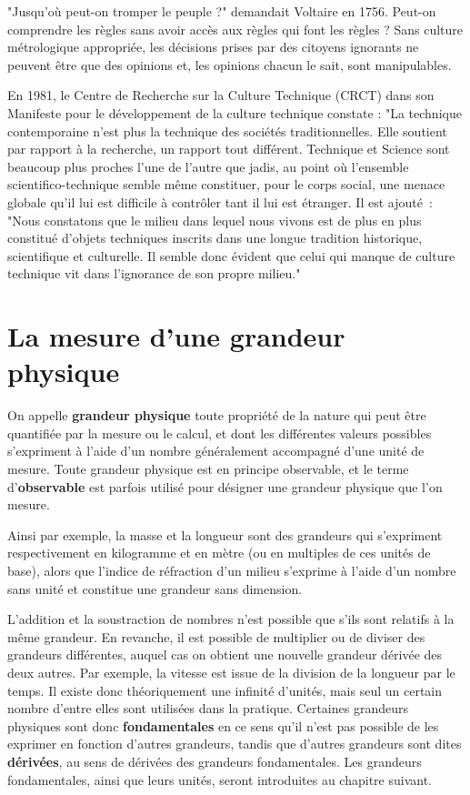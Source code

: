 \documentclass[main.tex]{subfiles}
\begin{document}
"Jusqu'où peut-on tromper le peuple ?" demandait Voltaire en 1756.  Peut-on comprendre les règles sans avoir accès aux règles qui font les règles ?  Sans culture métrologique appropriée, les décisions prises par des citoyens ignorants ne peuvent être que des opinions et, les opinions chacun le sait, sont manipulables.

En 1981, le Centre de Recherche sur la Culture Technique (CRCT) dans son Manifeste pour le développement de la culture technique constate : "La technique contemporaine n'est plus la technique des sociétés traditionnelles. Elle soutient par rapport à la recherche, un rapport tout différent. Technique et Science sont beaucoup plus proches l'une de l'autre que jadis, au point où l'ensemble scientifico-technique semble même constituer, pour le corps social, une menace globale qu'il lui est difficile à contrôler tant il lui est étranger. Il est ajouté~: "Nous constatons que le milieu dans lequel nous vivons est de plus en plus constitué d'objets techniques inscrits dans une longue tradition historique, scientifique et culturelle.  Il semble donc évident que celui qui manque de culture technique vit dans l'ignorance de son propre milieu."

\rm

\section{La mesure d'une grandeur physique}

On appelle \textbf{grandeur physique} toute propriété de la nature qui peut être quantifiée par la mesure ou le calcul, et dont les différentes valeurs possibles s'expriment à l'aide d'un nombre généralement accompagné d'une unité de mesure. Toute grandeur physique est en principe observable, et le terme d'\textbf{observable} est parfois utilisé pour désigner une grandeur physique que l'on mesure.

Ainsi par exemple, la masse et la longueur sont des grandeurs qui s'expriment respectivement en kilogramme et en mètre (ou en multiples de ces unités de base), alors que l'indice de réfraction d'un milieu s'exprime à l'aide d'un nombre sans unité et constitue une grandeur sans dimension.

L'addition et la soustraction de nombres n'est possible que s'ils sont relatifs à la même grandeur. En revanche, il est possible de multiplier ou de diviser des grandeurs différentes, auquel cas on obtient une nouvelle grandeur dérivée des deux autres. Par exemple, la vitesse est issue de la division de la longueur par le temps. Il existe donc théoriquement une infinité d'unités, mais seul un certain nombre d'entre elles sont utilisées dans la pratique. Certaines grandeurs physiques sont donc \textbf{fondamentales} en ce sens qu'il n'est pas possible de les exprimer en fonction d'autres grandeurs, tandis que d'autres grandeurs sont dites \textbf{dérivées}, au sens de dérivées des grandeurs fondamentales. Les grandeurs fondamentales, ainsi que leurs unités, seront introduites au chapitre suivant.
\end{document}
